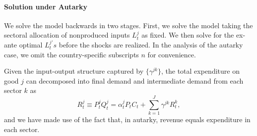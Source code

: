 \documentclass[12pt]{article}
\begin{document}
\paragraph{Solution under Autarky}

We solve the model backwards in two stages. First, we solve the model taking
the sectoral allocation of nonproduced inputs $L_{t}^{j}$ as fixed. We then
solve for the ex-ante optimal $L_{t}^{j\prime }s$ before the shocks are
realized. In the analysis of the autarky case, we omit the country-specific
subscripts $n$ for convenience.

Given the input-output structure captured by $\{\gamma^{jk}\}$, the total expenditure on good $j$ can decomposed into final demand and intermediate demand from each sector $k$ as
\[
R^j_t\equiv P^j_t Q^j_t = \alpha^j_t P_t C_t
 + \sum_{k=1}^J
 	\gamma^{jk} R^k_t,
\]
and we have made use of the fact that, in autarky, revenue equals expenditure in each sector.
\end{document}

